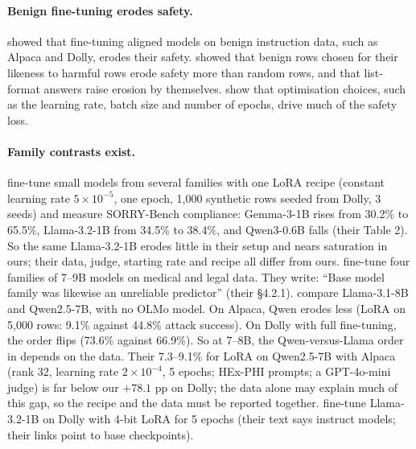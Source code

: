 \documentclass[11pt]{article}
\begin{document}
\paragraph{Benign fine-tuning erodes safety.} \citet{qi2024finetuning} showed
that fine-tuning aligned models on benign instruction data, such as Alpaca and
Dolly, erodes their safety. \citet{he2024safe} showed that benign rows chosen
for their likeness to harmful rows erode safety more than random rows, and that
list-format answers raise erosion by themselves.
\citet{kim2025rethinking} show that optimisation choices, such as the learning
rate, batch size and number of epochs, drive much of the safety loss.

\paragraph{Family contrasts exist.}
\citet{hawkins2026heterogeneoussafetyimpactsbenign} fine-tune small models from
several families with one LoRA recipe (constant learning rate
$5 \times 10^{-5}$, one epoch, 1,000 synthetic rows seeded from Dolly, 3
seeds) and measure SORRY-Bench compliance: Gemma-3-1B rises from 30.2\% to
65.5\%, Llama-3.2-1B from 34.5\% to 38.4\%, and Qwen3-0.6B falls (their Table
2). So the same Llama-3.2-1B erodes little in their setup and nears saturation
in ours; their data, judge, starting rate and recipe all differ from ours. \citet{khan2026safetydriftfinetuningevidence} fine-tune four families of
7--9B models on medical and legal data. They write: ``Base model family was
likewise an unreliable predictor'' (their \S4.2.1). \citet{guo2026safety}
compare Llama-3.1-8B and Qwen2.5-7B, with no OLMo model. On Alpaca, Qwen erodes
less (LoRA on 5,000 rows: 9.1\% against 44.8\% attack success). On Dolly with
full fine-tuning, the order flips (73.6\% against 66.9\%). So at 7--8B, the
Qwen-versus-Llama order in \citet{guo2026safety} depends on the data.
Their 7.3--9.1\% for LoRA on Qwen2.5-7B with Alpaca (rank 32, learning rate
$2 \times 10^{-4}$, 5 epochs; HEx-PHI prompts; a GPT-4o-mini judge) is far
below our $+78.1$ pp on Dolly; the data alone may explain much of this gap, so
the recipe and the data must be reported together.
\citet{fraser2025finetuninglowerssafetydisrupts} fine-tune Llama-3.2-1B on
Dolly with 4-bit LoRA for 5 epochs (their text says instruct models; their
links point to base checkpoints).
\end{document}
